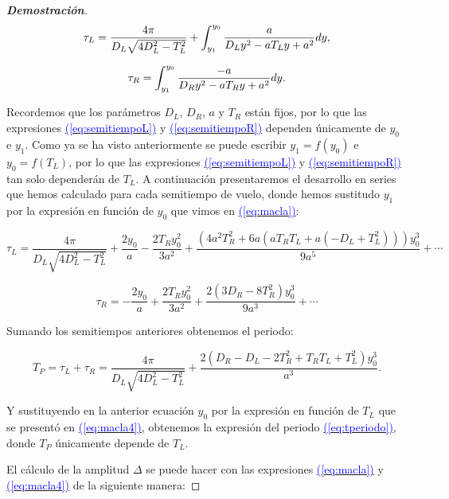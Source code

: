 \documentclass[12pt,a4paper]{report} %
\newcommand{\eref}[1]{\hyperref[#1]{\textcolor{blue}{(\ref*{#1})}}}
\begin{document}
\begin{proof}[\textbf{Demostración}]
		\begin{equation}
			\label{eq:semitiempoL}
			\scalebox{1}{$\displaystyle
				\tau_L=\frac{4\pi}{D_L\sqrt{4D_L^2-T_L^2}}+\int_{y_1}^{y_0}\frac{a}{D_Ly^2-aT_Ly+a^2}dy,
				$}
		\end{equation}\smallskip
		
		\begin{equation}
			\label{eq:semitiempoR}
			\scalebox{1}{$\displaystyle
				\tau_R=\int_{y_1}^{y_0}\frac{-a}{D_Ry^2-aT_Ry+a^2}dy.
				$}
		\end{equation}\smallskip
	
	\noindent Recordemos que los parámetros $D_L$, $D_R$, $a$ y $T_R$ están fijos, por lo que las expresiones \eref{eq:semitiempoL} y \eref{eq:semitiempoR} dependen únicamente de $y_0$ e $y_1$. Como ya se ha visto  anteriormente se puede escribir $y_1=f(y_0)$ e $y_0=f(T_L)$, por lo que las expresiones \eref{eq:semitiempoL} y \eref{eq:semitiempoR} tan solo dependerán de $T_L$. A continuación presentaremos el desarrollo en series que hemos calculado para cada semitiempo de vuelo, donde hemos sustitudo $y_1$ por la expresión en función de $y_0$ que vimos en \eref{eq:macla}:
	
	\begin{equation}
		\label{eq:seriestL}
		\tau_L=\frac{4\pi}{D_L\sqrt{4D_L^2-T_L^2}}+\frac{2y_0}{a}-\frac{2T_Ry_0^2}{3a^2}+\frac{(4a^2T_R^2+6a(aT_RT_L+a(-D_L+T_L^2)))y_0^3}{9a^5}+\cdots
	\end{equation}\smallskip
	
	\begin{equation}
		\label{eq:seriestR}
		\tau_R=-\frac{2y_0}{a}+\frac{2T_Ry_0^2}{3a^2}+\frac{2(3D_R-8T_R^2)y_0^3}{9a^3}+\cdots
	\end{equation}\smallskip
	
\noindent Sumando los semitiempos anteriores obtenemos el periodo:
	
	\begin{equation}
		T_P=\tau_L + \tau_R = \frac{4\pi}{D_L\sqrt{4D_L^2-T_L^2}}+\frac{2(D_R-D_L-2T_R^2+T_RT_L+T_L^2)y_0^3}{a^3}.
	\end{equation}\smallskip
	
	\noindent Y sustituyendo en la anterior ecuación $y_0$ por la expresión en función de $T_L$ que se presentó en \eref{eq:macla4}, obtenemos la expresión del periodo \eref{eq:tperiodo}, donde $T_P$ únicamente depende de $T_L$.
	
 	\vspace{0.5cm}El cálculo de la amplitud $\varDelta$ se puede hacer con las expresiones \eref{eq:macla} y \eref{eq:macla4} de la siguiente manera:
	

\end{proof}
\end{document}
